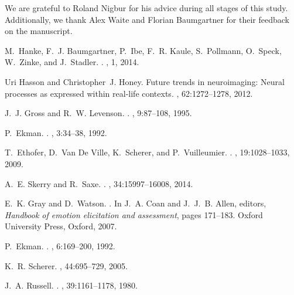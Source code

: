 \documentclass[10pt,a4paper,twocolumn]{article}
\begin{document}
We are grateful to Roland Nigbur for his advice during all stages of this
study. Additionally, we thank Alex Waite and Florian Baumgartner for their
feedback on the manuscript.

{\small
\begin{thebibliography}{10}

M.~Hanke, F.~J. Baumgartner, P.~Ibe, F.~R. Kaule, S.~Pollmann, O.~Speck,
  W.~Zinke, and J.~Stadler.
.
, 1, 2014.

Uri Hasson and Christopher~J. Honey.
\newblock Future trends in neuroimaging: Neural processes as expressed within
  real-life contexts.
, 62:1272--1278, 2012.

J.~J. Gross and R.~W. Levenson.
.
, 9:87--108, 1995.

P.~Ekman.
.
, 3:34--38, 1992.

T.~Ethofer, D.~{Van De Ville}, K.~Scherer, and P.~Vuilleumier.
.
, 19:1028--1033, 2009.

A.~E. Skerry and R.~Saxe.
.
, 34:15997--16008, 2014.

E.~K. Gray and D.~Watson.
.
\newblock In J.~A. Coan and J.~J.~B. Allen, editors, {\em {Handbook of emotion
  elicitation and assessment}}, pages 171--183. Oxford University Press,
  Oxford, 2007.

P.~Ekman.
.
, 6:169--200, 1992.

K.~R. Scherer.
, 44:695--729, 2005.

J.~A. Russell.
.
, 39:1161--1178,
  1980.


\end{thebibliography}}
\end{document}

